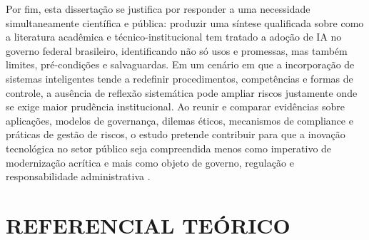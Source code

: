 \documentclass[12pt,a4paper]{article}
\begin{document}
Por fim, esta dissertação se justifica por responder a uma necessidade simultaneamente científica e pública: produzir uma síntese qualificada sobre como a literatura acadêmica e técnico-institucional tem tratado a adoção de IA no governo federal brasileiro, identificando não só usos e promessas, mas também limites, pré-condições e salvaguardas. Em um cenário em que a incorporação de sistemas inteligentes tende a redefinir procedimentos, competências e formas de controle, a ausência de reflexão sistemática pode ampliar riscos justamente onde se exige maior prudência institucional. Ao reunir e comparar evidências sobre aplicações, modelos de governança, dilemas éticos, mecanismos de compliance e práticas de gestão de riscos, o estudo pretende contribuir para que a inovação tecnológica no setor público seja compreendida menos como imperativo de modernização acrítica e mais como objeto de governo, regulação e responsabilidade administrativa \autocite{goulart2025processos} \autocite{alhosani2024opportunities} \autocite{yiitcanlar2022artificial} \autocite{sharma2021implementing}.
\section{REFERENCIAL TEÓRICO}
\label{sec:org31b721f}
\end{document}
